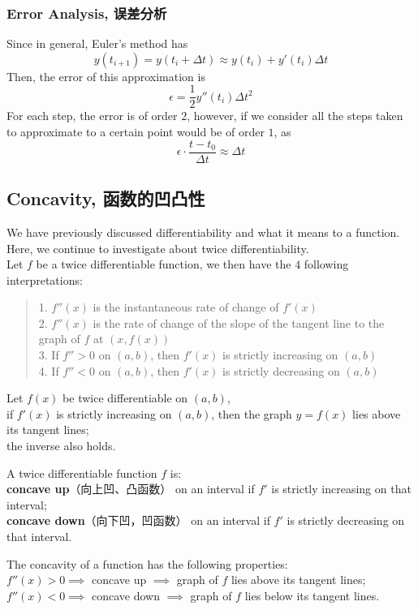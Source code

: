 \subsubsection{Error Analysis, 误差分析}
Since in general, Euler's method has
$$y(t_{i+1}) = y(t_i + \Delta t) \approx y(t_i) + y'(t_i)\Delta t$$
Then, the error of this approximation is
$$\epsilon = \frac{1}{2}y''(t_i)\Delta t^2$$
For each step, the error is of order $2$, however, if we consider all the steps taken to approximate to a certain point would be of order $1$, as
$$\epsilon \cdot \frac{t-t_0}{\Delta t} \approx \Delta t$$

\subsection{Concavity, 函数的凹凸性}
We have previously discussed differentiability and what it means to a function. Here, we continue to investigate about twice differentiability. \\
Let $f$ be a twice differentiable function, we then have the $4$ following interpretations:
\begin{quote}
    1. $f''(x)$ is the instantaneous rate of change of $f'(x)$ \\
    2. $f''(x)$ is the rate of change of the slope of the tangent line to the graph of $f$ at $(x, f(x))$ \\
    3. If $f'' > 0$ on $(a, b)$, then $f'(x)$ is strictly increasing on $(a, b)$ \\
    4. If $f'' < 0$ on $(a, b)$, then $f'(x)$ is strictly decreasing on $(a, b)$
\end{quote}
\begin{theorem}
    Let $f(x)$ be twice differentiable on $(a, b)$, \\
    if $f'(x)$ is strictly increasing on $(a, b)$, then the graph $y=f(x)$ lies above its tangent lines; \\
    the inverse also holds.
\end{theorem}
\begin{definition}
    A twice differentiable function $f$ is: \\
    \textbf{concave up}（向上凹、凸函数） on an interval if $f'$ is strictly increasing on that interval; \\
    \textbf{concave down}（向下凹，凹函数） on an interval if $f'$ is strictly decreasing on that interval.
\end{definition}
\begin{theorem}
    The concavity of a function has the following properties: \\
    $f''(x)>0 \implies$ concave up $\implies$ graph of $f$ lies above its tangent lines; \\
    $f''(x)<0 \implies$ concave down $\implies$ graph of $f$ lies below its tangent lines.
\end{theorem}

